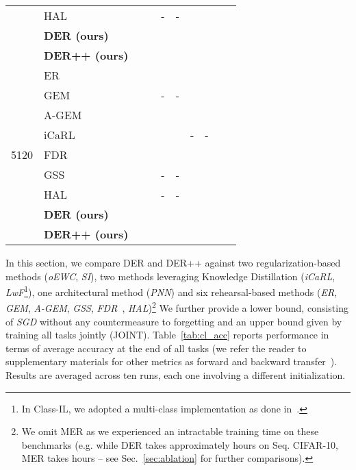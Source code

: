 \documentclass{article}
\begin{document}
\begin{table*}[t]
{\begin{tabular}{clcccccccc}
    & HAL~\cite{chaudhry2020using}          & \tiny{} & \tiny{} & - & - & \tiny{} & \tiny{} \\
    & \textbf{DER (ours)} & \tiny{} & \tiny{} & \tiny{} & \tiny{} & \tiny{} & \tiny{} \\
    & \textbf{DER++ (ours)} & \tiny{} & \tiny{} &  \tiny{} & \tiny{} & \tiny{} & \tiny{} \\
\midrule
     & ER~\cite{riemer2018learning} & \tiny{} & \tiny{} & \tiny{} & \tiny{} & \tiny{} & \tiny{} \\
     & GEM~\cite{lopez2017gradient} & \tiny{} &  \tiny{} & - & - & \tiny{} & \tiny{}\\
     & A-GEM~\cite{chaudhry2018efficient} & \tiny{} & \tiny{} & \tiny{} & \tiny{} & \tiny{} & \tiny{} \\              
     & iCaRL~\cite{rebuffi2017icarl} & \tiny{} & \tiny{} & \tiny{} & \tiny{} & -     & -     \\
5120 & FDR~\cite{benjamin2018measuring}          & \tiny{} & \tiny{} & \tiny{} & \tiny{} & \tiny{} & \tiny{} \\
     & GSS~\cite{aljundi2019gradient}          & \tiny{} & \tiny{} & - & - & \tiny{} & \tiny{} \\
     & HAL~\cite{chaudhry2020using}          & \tiny{} & \tiny{} & - & - & \tiny{} & \tiny{} \\
     & \textbf{DER (ours)} & \tiny{} & \tiny{} & \tiny{} & \tiny{} & \tiny{} & \tiny{} \\
     & \textbf{DER++ (ours)} & \tiny{} & \tiny{} & \tiny{} & \tiny{} & \tiny{} & \tiny{} \\
\bottomrule
\end{tabular}
}
\caption{Classification results for standard CL benchmarks, averaged across  runs. `-' indicates experiments we were unable to run, because of compatibility issues (\textit{e.g.}\ between PNN, iCaRL and LwF in Domain-IL) or intractable training time (\textit{e.g.}\ GEM, HAL or GSS on Tiny ImageNet).}
\label{tab:cl_acc}
\end{table*} In this section, we compare DER and DER++ against two regularization-based methods (\textit{oEWC}, \textit{SI}), two methods leveraging Knowledge Distillation (\textit{iCaRL}, \textit{LwF}\footnote{In Class-IL, we adopted a multi-class implementation as done in~\cite{rebuffi2017icarl}.}), one architectural method (\textit{PNN}) and six rehearsal-based methods (\textit{ER}, \textit{GEM}, \textit{A-GEM}, \textit{GSS}, \textit{FDR}~\cite{benjamin2018measuring}, \textit{HAL})\footnote{We omit MER as we experienced an intractable training time on these benchmarks (e.g. while DER takes approximately  hours on Seq. CIFAR-10, MER takes  hours -- see Sec.~\ref{sec:ablation} for further comparisons). }
We further provide a lower bound, consisting of \textit{SGD} without any countermeasure to forgetting and an upper bound given by training all tasks jointly (JOINT). Table~\ref{tab:cl_acc} reports performance in terms of average accuracy at the end of all tasks (we refer the reader to supplementary materials for other metrics as forward and backward transfer~\cite{lopez2017gradient}). Results are averaged across ten runs, each one involving a different initialization. 
\end{document}

